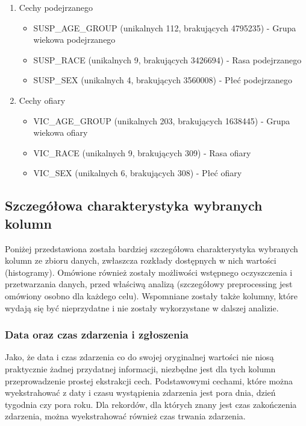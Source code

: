 \documentclass{classrep}
\begin{document}
{{\begin{enumerate}
\begin{itemize}
                \end{itemize}
                \item Cechy podejrzanego
                \begin{itemize}
                    \item SUSP\_AGE\_GROUP (unikalnych 112, brakujących 4795235) - Grupa wiekowa podejrzanego
                    \item SUSP\_RACE (unikalnych 9, brakujących 3426694) - Rasa podejrzanego
                    \item SUSP\_SEX (unikalnych 4, brakujących 3560008) - Płeć podejrzanego
                \end{itemize}
                \item Cechy ofiary
                \begin{itemize}
                    \item VIC\_AGE\_GROUP (unikalnych 203, brakujących 1638445) - Grupa wiekowa ofiary
                    \item VIC\_RACE (unikalnych 9, brakujących 309) - Rasa ofiary
                    \item VIC\_SEX (unikalnych 6, brakujących 308) - Płeć ofiary
                \end{itemize}
            \end{enumerate}
        }

        \subsection{Szczegółowa charakterystyka wybranych kolumn} {

            Poniżej przedstawiona została bardziej szczegółowa charakterystyka
            wybranych kolumn ze zbioru danych, zwłaszcza rozkłady dostępnych w nich
            wartości (histogramy). Omówione również zostały możliwości wstępnego
            oczyszczenia i przetwarzania danych, przed właściwą analizą (szczegółowy
            preprocessing jest omówiony osobno dla każdego celu). Wspomniane zostały
            także kolumny, które wydają się być nieprzydatne i nie zostały wykorzystane
            w dalszej analizie.

            \subsubsection{Data oraz czas zdarzenia i zgłoszenia} {

                Jako, że data i czas zdarzenia co do swojej oryginalnej wartości nie
                niosą praktycznie żadnej przydatnej informacji, niezbędne jest dla tych
                kolumn przeprowadzenie prostej ekstrakcji cech. Podstawowymi cechami,
                które można wyekstrahować z daty i czasu wystąpienia zdarzenia jest
                pora dnia, dzień tygodnia czy pora roku. Dla rekordów, dla których
                znany jest czas zakończenia zdarzenia, można wyekstrahować również czas
                trwania zdarzenia.
                
}}}
\end{document}
